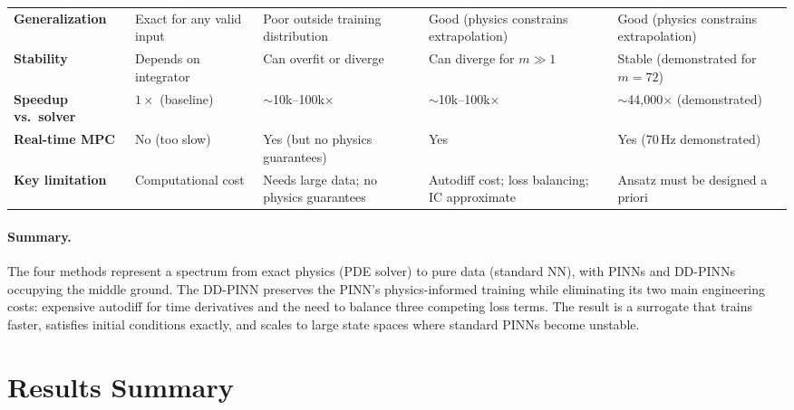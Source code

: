 \documentclass[11pt]{article}
\begin{document}
\begin{landscape}
\begin{table}[H]
\begin{tabular}{@{} p{2.8cm} p{4.2cm} p{4.2cm} p{4.2cm} p{4.2cm} @{}}
\textbf{Generalization}
    & Exact for any valid input
    & Poor outside training distribution
    & Good (physics constrains extrapolation)
    & Good (physics constrains extrapolation) \\

\textbf{Stability}
    & Depends on integrator
    & Can overfit or diverge
    & Can diverge for $m \gg 1$
    & Stable (demonstrated for $m = 72$) \\

\textbf{Speedup vs.\ solver}
    & $1\times$ (baseline)
    & $\sim$10k--100k$\times$
    & $\sim$10k--100k$\times$
    & $\sim$44,000$\times$ (demonstrated) \\

\textbf{Real-time MPC}
    & No (too slow)
    & Yes (but no physics guarantees)
    & Yes
    & Yes (70\,Hz demonstrated) \\

\textbf{Key limitation}
    & Computational cost
    & Needs large data; no physics guarantees
    & Autodiff cost; loss balancing; IC approximate
    & Ansatz must be designed a priori \\

\bottomrule
\end{tabular}
\end{table}

\end{landscape}

\paragraph{Summary.} The four methods represent a spectrum from exact physics (PDE solver) to pure data (standard NN), with PINNs and DD-PINNs occupying the middle ground. The DD-PINN preserves the PINN's physics-informed training while eliminating its two main engineering costs: expensive autodiff for time derivatives and the need to balance three competing loss terms. The result is a surrogate that trains faster, satisfies initial conditions exactly, and scales to large state spaces where standard PINNs become unstable.

\section{Results Summary}
\end{document}
